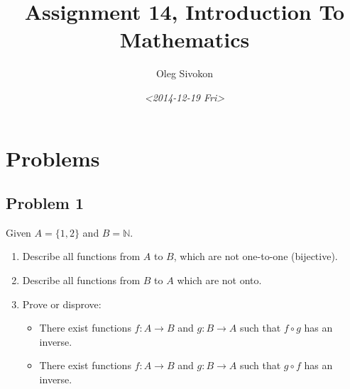 \documentclass[11pt]{article}
\author{Oleg Sivokon}
\date{\textit{<2014-12-19 Fri>}}
\title{Assignment 14, Introduction To Mathematics}
\begin{document}
\maketitle
\tableofcontents



\clearpage

\section{Problems}
\label{sec-1}

\subsection{Problem 1}
\label{sec-1-1}

Given $A = \{1, 2\}$ and $B = \mathbb{N}$.
\begin{enumerate}
\item Describe all functions from $A$ to $B$, which are not one-to-one (bijective).
\item Describe all functions from $B$ to $A$ which are not onto.
\item Prove or disprove:
\begin{itemize}
\item There exist functions $f : A \to B$ and $g : B \to A$ such that $f \circ g$
has an inverse.
\item There exist functions $f : A \to B$ and $g : B \to A$ such that $g \circ f$
has an inverse.
\end{itemize}
\end{enumerate}
\end{document}
